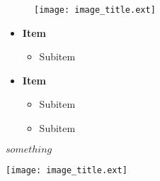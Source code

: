 
\begin{figure}
 \centering
 \label{fig:bar}
 \texttt{[image: image\_title.ext]}
\end{figure}



\begin{table}
\caption{caption_title}
\centering
{}
\end{table}


\begin{itemize}
\item \textbf{Item}
	\begin{itemize}
	\item Subitem
	\end{itemize}
\item \textbf{Item}
	\begin{itemize}
  \item Subitem
	\item Subitem
	\end{itemize}
\end{itemize}


$something$ %

\command %
\command* %

\approx %
\author{}
\texttt{[image: image\_title.ext]}
\item
\lfoot{}
